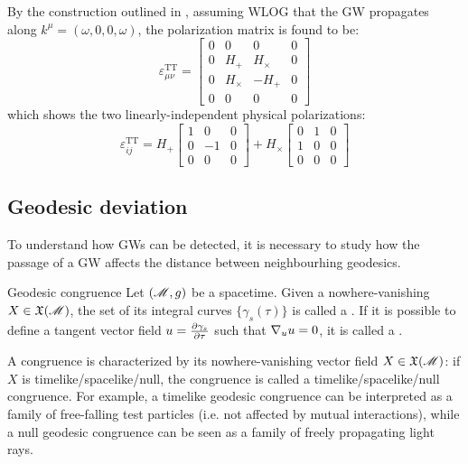 By the construction outlined in , assuming WLOG that the GW propagates along $ k^\mu = (\omega , 0 , 0 , \omega) $, the polarization matrix is found to be:
\begin{equation}
  \varepsilon_{\mu \nu}^\text{TT} =
  \begin{bmatrix}
    0 & 0 & 0 & 0 \\
    0 & H_+ & H_\times & 0 \\
    0 & H_\times & - H_+ & 0 \\
    0 & 0 & 0 & 0
  \end{bmatrix}
\end{equation}
which shows the two linearly-independent physical polarizations:
\begin{equation*}
  \varepsilon_{ij}^\text{TT} = H_+
  \begin{bmatrix}
    1 & 0 & 0 \\
    0 & -1 & 0 \\
    0 & 0 & 0
  \end{bmatrix}
  + H_\times
  \begin{bmatrix}
    0 & 1 & 0 \\
    1 & 0 & 0 \\
    0 & 0 & 0
  \end{bmatrix}
\end{equation*}

\subsection{Geodesic deviation}

To understand how GWs can be detected, it is necessary to study how the passage of a GW affects the distance between neighbourhing geodesics.

\begin{definition}{Geodesic congruence}{}
  Let $ (\mathscr{M} , g) $ be a spacetime. Given a nowhere-vanishing $ X \in \mathfrak{X}(\mathscr{M}) $, the set of its integral curves $ \{\gamma_s(\tau)\} $ is called a . If it is possible to define a tangent vector field $ u = \frac{\partial \gamma_s}{\partial \tau} $ such that $ \nabla_u u = 0 $, it is called a .
\end{definition}

A congruence is characterized by its nowhere-vanishing vector field $ X \in \mathfrak{X}(\mathscr{M}) $: if $ X $ is timelike/spacelike/null, the congruence is called a timelike/spacelike/null congruence. For example, a timelike geodesic congruence can be interpreted as a family of free-falling test particles (i.e. not affected by mutual interactions), while a null geodesic congruence can be seen as a family of freely propagating light rays.

